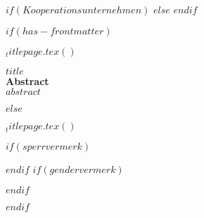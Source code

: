 $if(Kooperationsunternehmen)$  
\newcommand{\kooperationsunternehmen}{$Kooperationsunternehmen$}
$else$
\newcommand{\kooperationsunternehmen}{Unternehmen GmbH}
$endif$


$if(has-frontmatter)$
  \begin{frontmatter}
  \begin{titlepage}
  $_titlepage.tex()$
  
  \end{titlepage}
  
	\center %

  	{\huge\bfseries $title$}\\[2cm] %

  	{\large\bfseries Abstract}\\[0.4cm] %

$abstract$
  
  \end{frontmatter}
$else$
  \begin{titlepage}
  $_titlepage.tex()$
  
  \end{titlepage}
  


$if(sperrvermerk)$

\clearpage
$endif$
$if(gendervermerk)$

\clearpage
$endif$

$endif$ %